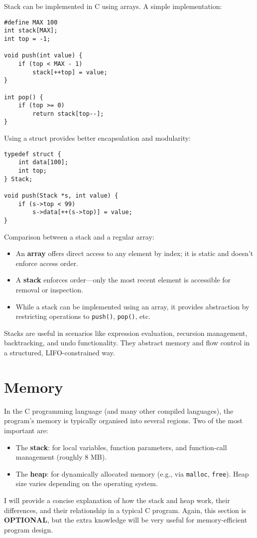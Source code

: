 \documentclass[a4paper,12pt]{article}
\begin{document}
Stack can be implemented in C using arrays. A simple implementation:

\begin{lstlisting}[caption=Stack operations]
#define MAX 100
int stack[MAX];
int top = -1;

void push(int value) {
    if (top < MAX - 1)
        stack[++top] = value;
}

int pop() {
    if (top >= 0)
        return stack[top--];
}
\end{lstlisting}

Using a struct provides better encapsulation and modularity:

\begin{lstlisting}[caption=Stacks with structs]
typedef struct {
    int data[100];
    int top;
} Stack;

void push(Stack *s, int value) {
    if (s->top < 99)
        s->data[++(s->top)] = value;
}
\end{lstlisting}

Comparison between a stack and a regular array:
\begin{itemize}[leftmargin=*]
    \item An \textbf{array} offers direct access to any element by index; it is static and doesn't enforce access order.
    \item A \textbf{stack} enforces order—only the most recent element is accessible for removal or inspection.
    \item While a stack can be implemented using an array, it provides abstraction by restricting operations to \texttt{push()}, \texttt{pop()}, etc.
\end{itemize}

Stacks are useful in scenarios like expression evaluation, recursion management, backtracking, and undo functionality. They abstract memory and flow control in a structured, LIFO-constrained way.

\hrulefill

\newpage

\section{\huge{Memory}}

In the C programming language (and many other compiled languages), the program’s memory is typically organised into several regions. Two of the most important are:
\begin{itemize}
    \item The \textbf{stack}: for local variables, function parameters, and function-call management (roughly 8 MB).
    \item The \textbf{heap}: for dynamically allocated memory (e.g., via \texttt{malloc}, \texttt{free}). Heap size varies depending on the operating system.
\end{itemize}
I will provide a concise explanation of how the stack and heap work, their differences, and their relationship in a typical C program. Again, this section is \textbf{OPTIONAL}, but the extra knowledge will be very useful for memory-efficient program design.
\end{document}
